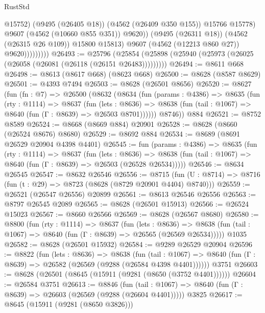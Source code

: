\begin{lexlean}{RustStd}
\begin{coremodule}
                                @15752)
                              (@9495 (@26405 @18))
                              (@4562 (@26409 @350 @155))
                              @15766
                              @15778)
                            @9607
                            (@4562 (@10660 @855 @351))
                            @9620))
                        (@9495 (@26311 @18))
                        (@4562 (@26315 @26 @109))
                        @15800
                        @15813)
                      @9607
                      (@4562 (@12213 @860 @27))
                      @9620)))))))))
@26493 := @25796
    (@25854 (@25898 (@25940 (@25973 (@26025 (@26058 (@26081 (@26118 (@26151 @26483)))))))))
@26494 := @8611 @668
@26498 := @8613 (@8617 @668) (@8623 @668)
@26500 := @8628 (@8587 @8629)
@26501 := @4393 @7494
@26503 := @8628 (@26501 @8656)
@26520 := @8627
    (fun (fn : @7) =>
    @26500
      (@8632
        (@8634
          (fun (params : @4386) =>
          @8635
            (fun (rty : @1114) =>
            @8637
              (fun (lets : @8636) =>
              @8638 (fun (tail : @1067) => @8640 (fun (Γ : @8639) => @26503 @8701))))))
        @8746))
    @884
@26521 := @8752 @8589
@26524 := @8668 (@8669 @884) @20901
@26528 := @8628 (@8660 (@26524 @8676) @8680)
@26529 := @8692 @884
@26534 := @8689 (@8691 @26529 @20904 @4398 @4401)
@26545 := fun (params : @4386) =>
  @8635
    (fun (rty : @1114) =>
    @8637
      (fun (lets : @8636) =>
      @8638 (fun (tail : @1067) => @8640 (fun (Γ : @8639) => @26503 (@26528 @26534)))))
@26546 := @8634 @26545
@26547 := @8632 @26546
@26556 := @8715
    (fun (U : @8714) => @8716 (fun (t : @29) => @8723 (@8628 (@8729 @20901 @4404) @8740)))
@26559 := @26521 (@26547 @26556) @20899
@26561 := @8613 @26546 @26556
@26563 := @8797 @26545 @2089
@26565 := @8628 (@26501 @15913)
@26566 := @26524 @15023
@26567 := @8660 @26566
@26569 := @8628 (@26567 @8680)
@26580 := @8800
    (fun (rty : @1114) =>
    @8637
      (fun (lets : @8636) =>
      @8638 (fun (tail : @1067) => @8640 (fun (Γ : @8639) => @26565 (@26569 @26534)))))
    @1035
@26582 := @8628 (@26501 @15932)
@26584 := @9289 @26529 @20904
@26596 := @8822
    (fun (lets : @8636) =>
    @8638
      (fun (tail : @1067) =>
      @8640 (fun (Γ : @8639) => @26582 (@26569 (@9288 (@26584 @4398 @4401))))))
    @3751
@26603 := @8628 (@26501 (@8645 (@15911 (@9281 (@8650 (@3752 @4401))))))
@26604 := @26584 @3751
@26613 := @8846
    (fun (tail : @1067) => @8640 (fun (Γ : @8639) => @26603 (@26569 (@9288 (@26604 @4401)))))
    @3825
@26617 := @8645 (@15911 (@9281 (@8650 @3826)))

\end{coremodule}
\end{lexlean}
